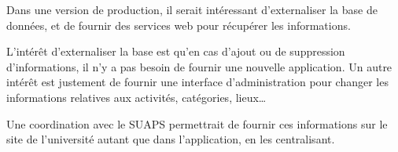 \documentclass{article}
\begin{document}
        Dans une version de production, il serait intéressant d'externaliser la
        base de données, et de fournir des services web pour récupérer les
        informations.

        L'intérêt d'externaliser la base est qu'en cas d'ajout ou de suppression
        d'informations, il n'y a pas besoin de fournir une nouvelle application.
        Un autre intérêt est justement de fournir une interface d'administration
        pour changer les informations relatives aux activités, catégories,
        lieux\dots

        Une coordination avec le SUAPS permettrait de fournir ces informations
        sur le site de l'université autant que dans l'application, en les centralisant.
\end{document}
